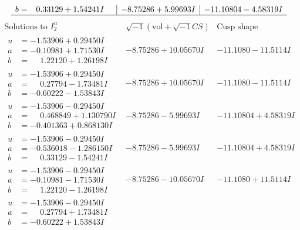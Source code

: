 \documentclass[1p]{elsarticle_modified}
\theoremstyle{definition}
\newcommand{\I}{\sqrt{-1}}
\begin{document}
$$\begin{array}{c|c|c}
\begin{aligned}
b &= \phantom{-}0.33129 + 1.54241 I\end{aligned}
 & -8.75286 + 5.99693 I & -11.10804 - 4.58319 I\\
 \hline 
 \end{array}$$\newpage$$\begin{array}{c|c|c}  
\text{Solutions to }I^u_{2}& \I (\text{vol} + \sqrt{-1}CS) & \text{Cusp shape}\\
 \hline 
\begin{aligned}
u &= -1.53906 + 0.29450 I \\
a &= -0.10981 + 1.71530 I \\
b &= \phantom{-}1.22120 + 1.26198 I\end{aligned}
 & -8.75286 + 10.05670 I & -11.1080 - 11.5114 I \\ \hline\begin{aligned}
u &= -1.53906 + 0.29450 I \\
a &= \phantom{-}0.27794 - 1.73481 I \\
b &= -0.60222 - 1.53843 I\end{aligned}
 & -8.75286 + 10.05670 I & -11.1080 - 11.5114 I \\ \hline\begin{aligned}
u &= -1.53906 - 0.29450 I \\
a &= \phantom{-}0.468849 + 1.130790 I \\
b &= -0.401363 + 0.868130 I\end{aligned}
 & -8.75286 - 5.99693 I & -11.10804 + 4.58319 I \\ \hline\begin{aligned}
u &= -1.53906 - 0.29450 I \\
a &= -0.536018 - 1.286150 I \\
b &= \phantom{-}0.33129 - 1.54241 I\end{aligned}
 & -8.75286 - 5.99693 I & -11.10804 + 4.58319 I \\ \hline\begin{aligned}
u &= -1.53906 - 0.29450 I \\
a &= -0.10981 - 1.71530 I \\
b &= \phantom{-}1.22120 - 1.26198 I\end{aligned}
 & -8.75286 - 10.05670 I & -11.1080 + 11.5114 I \\ \hline\begin{aligned}
u &= -1.53906 - 0.29450 I \\
a &= \phantom{-}0.27794 + 1.73481 I \\
b &= -0.60222 + 1.53843 I\end{aligned}

\end{array}$$
\end{document}
